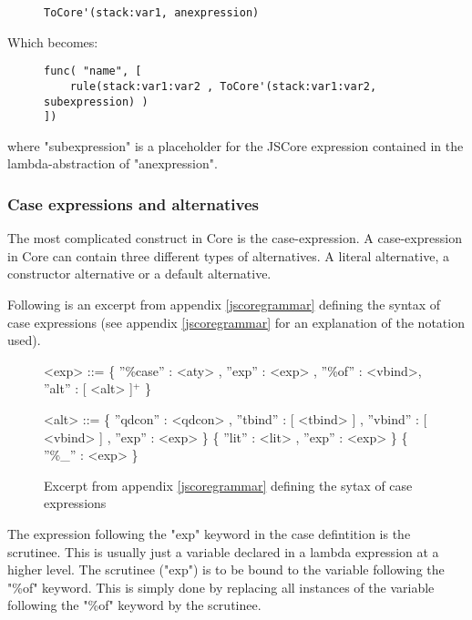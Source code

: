\begin{figure}[H]
\lstset{ %
language=Haskell,
caption=Lambda abstraction in Core' format,
label=lst:int1
}
\begin{lstlisting}
ToCore'(stack:var1, anexpression)
\end{lstlisting}
\end{figure}

Which becomes:

\begin{figure}[H]
\lstset{ %
language=Haskell,
caption=Lambda abstraction in Core' format,
label=lst:int1
}
\begin{lstlisting}
func( "name", [
    rule(stack:var1:var2 , ToCore'(stack:var1:var2, subexpression) )
])
\end{lstlisting}
\end{figure}

where "subexpression" is a placeholder for the JSCore expression contained in the 
lambda-abstraction of "anexpression".


\subsubsection*{Case expressions and alternatives}

The most complicated construct in Core is the case-expression. A case-expression
in Core can contain three different types of alternatives. A literal alternative,
a constructor alternative or a default alternative. 

Following is an excerpt from appendix \ref{jscoregrammar} defining the syntax 
of case expressions (see appendix \ref{jscoregrammar} for an explanation of the
notation used).

\begin{figure}[H]
\scriptsize
\begin{grammar}

<exp>		  ::= 	 \{ ''\%case'' : <aty> , ''exp'' : <exp> , ''\%of'' : <vbind>, ''alt'' : [ <alt> ]$^{+}$ \}	

<alt>		  ::= 	 \{ ''qdcon'' : <qdcon> , ''tbind'' : [ <tbind> ] , ''vbind'' : [ <vbind> ] , ''exp'' : <exp> \}
		  \alt 			 \{ ''lit'' : <lit> , ''exp'' : <exp> \}
		  \alt 			 \{ ''\%\_'' : <exp> \}	
\end{grammar}

\label{caseexpr}
\caption{Excerpt from appendix \ref{jscoregrammar} defining the sytax of case expressions}
\end{figure}

The expression following the "exp" keyword in the case defintition is the scrutinee. This
is usually just a variable declared in a lambda expression at a higher level.
The scrutinee ("exp") is to be bound to the variable following the "\%of" keyword.
This is simply done by replacing all instances of the variable following the "\%of" keyword
by the scrutinee.


